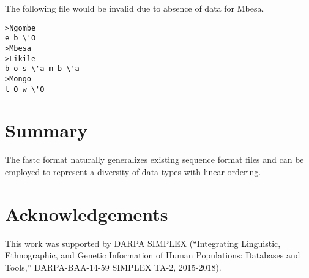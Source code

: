 \documentclass[12pt]{article}
\begin{document}
The following file would be invalid due to absence of data for Mbesa.

\begin{verbatim}
>Ngombe
e b \'O
>Mbesa
>Likile
b o s \'a m b \'a
>Mongo
l O w \'O
\end{verbatim}
\doublespace
\section{Summary}
The fastc format naturally generalizes existing sequence format files and can be employed to
represent a diversity of
data types with linear ordering.

\section{Acknowledgements}
This work was supported by DARPA SIMPLEX (``Integrating Linguistic, Ethnographic, and Genetic Information of Human Populations: Databases and Tools,'' DARPA-BAA-14-59 SIMPLEX TA-2, 2015-2018). 
\newpage

\end{document}

